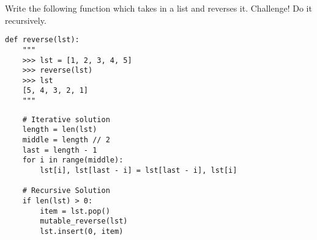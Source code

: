 \begin{blocksection}
\question Write the following function which takes in a list and reverses it. Challenge! Do it recursively.

\begin{lstlisting}
def reverse(lst):
    """
    >>> lst = [1, 2, 3, 4, 5]
    >>> reverse(lst)
    >>> lst
    [5, 4, 3, 2, 1]
    """
\end{lstlisting}

\begin{solution}[2in]
\begin{lstlisting}
    # Iterative solution
    length = len(lst)
    middle = length // 2
    last = length - 1
    for i in range(middle):
        lst[i], lst[last - i] = lst[last - i], lst[i]

    # Recursive Solution
    if len(lst) > 0:
        item = lst.pop()
        mutable_reverse(lst)
        lst.insert(0, item)
\end{lstlisting}

\end{solution}
\end{blocksection}
